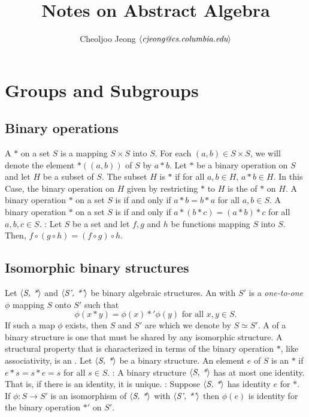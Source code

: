 \documentclass{myproc}
\def\sbf{\sf\bfseries}
\begin{document}
\title{\large\bf Notes on Abstract Algebra \vspace*{-0.5cm}}
\author{\normalsize{}Cheoljoo Jeong $\mbox{$\langle{\textit{\mbox{cjeong@cs.columbia.edu}}}\rangle$}$}
\maketitle
\small

\section{Groups and Subgroups}
\subsection{Binary operations}
\bit
\w A  $*$ 
on a set $S$ is a  mapping $S \times
S$ into $S$. For each $(a, b) \in S \times S$, we will denote the element
$*((a, b))$ of $S$ by $a * b$.
\w Let $*$ be a binary operation on $S$ and let $H$ be a subset of $S$. The
subset $H$ is  $*$ if for all $a, b \in H$, $a * b \in H$. In
this Case, the binary operation on $H$ given by restricting $*$ to $H$ is the
 of $*$ on $H$.
\w A binary operation $*$ on a set $S$ is  if and only if $a *
b = b * a$ for all $a, b \in S$.
\w A binary operation $*$ on a set $S$ is  if and only if $a *
(b * c) = (a * b) * c$ for all $a, b, c \in S$.
\w {\sbf Theorem}: Let $S$ be a set and let $f, g$ and $h$ be functions
mapping $S$ into $S$. Then, $f \circ (g \circ h) = (f \circ g) \circ h$.
\eit

\subsection{Isomorphic binary structures}
\bit
\w Let $\mbox{$\langle{\textit{S, *}}\rangle$}$ and $\mbox{$\langle{\textit{S', *'}}\rangle$}$ be binary algebraic structures. An
 with $S'$ is a {\em one-to-one\/} $\phi$ mapping $S$
onto $S'$ such that
 \[ \phi(x * y) = \phi(x) *' \phi(y) \mbox{\ \ \ for all $x, y \in S$}.\]
If such a map $\phi$ exists, then $S$ and $S'$ are  which we denote by $S \simeq S'$.
\w A  of a binary structure  is one that must be
  shared by any isomorphic structure.
\w A structural property that is characterized in terms of the binary
  operation $*$, like associativity, is an .
\w Let $\mbox{$\langle{\textit{S, *}}\rangle$}$ be a binary structure. An element $e$ of $S$ is an
   $*$ if $e * s = s * e = s$ for all $s \in S$.
\w {\sbf Theorem}: 
  A binary structure $\mbox{$\langle{\textit{S, *}}\rangle$}$ has at most one identity. That is, if there
  is an identity, it is unique.
\w {\sbf Theorem}: Suppose $\mbox{$\langle{\textit{S, *}}\rangle$}$ has identity $e$ for $*$. If $\phi: S
  \rightarrow S'$ is an isomorphism of $\mbox{$\langle{\textit{S, *}}\rangle$}$ with $\mbox{$\langle{\textit{S', *'}}\rangle$}$ then
  $\phi(e)$ is identity for the binary operation $*'$ on $S'$.
\eit
\end{document}

